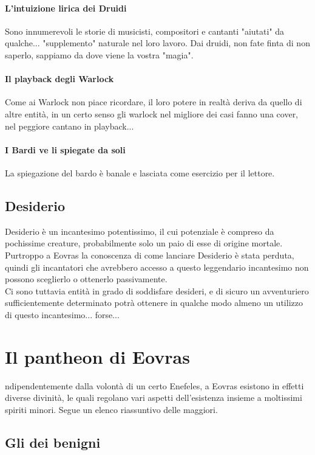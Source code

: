\paragraph{L'intuizione lirica dei Druidi}Sono innumerevoli le storie di musicisti, compositori e cantanti "aiutati" da qualche... "supplemento" naturale nel loro lavoro. Dai druidi, non fate finta di non saperlo, sappiamo da dove viene la vostra "magia".
\paragraph{Il playback degli Warlock}Come ai Warlock non piace ricordare, il loro potere in realtà deriva da quello di altre entità, in un certo senso gli warlock nel migliore dei casi fanno una cover, nel peggiore cantano in playback...
\paragraph{I Bardi ve li spiegate da soli}La spiegazione del bardo è banale e lasciata come esercizio per il lettore.

\subsection{Desiderio}

Desiderio è un incantesimo potentissimo, il cui potenziale è compreso da pochissime creature, probabilmente solo un paio di esse di origine mortale. \\ Purtroppo a Eovras la conoscenza di come lanciare Desiderio è stata perduta, quindi gli incantatori che avrebbero accesso a questo leggendario incantesimo non possono sceglierlo o ottenerlo passivamente. \\ Ci sono tuttavia entità in grado di soddisfare desideri, e di sicuro un avventuriero sufficientemente determinato potrà ottenere in qualche modo almeno un utilizzo di questo incantesimo... forse...

\section{Il pantheon di Eovras}

ndipendentemente dalla volontà di un certo Enefeles, a Eovras esistono in effetti diverse divinità, le quali regolano vari aspetti dell'esistenza insieme a moltissimi spiriti minori. Segue un elenco riassuntivo delle maggiori.

\subsection{Gli dei benigni}

